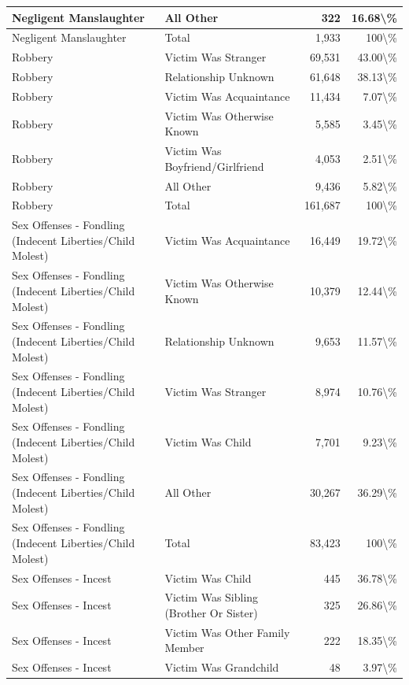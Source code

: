 \documentclass[
]{krantz}
\begin{document}
\begin{longtable}[t]{l|l|r|r}
\hline
Negligent Manslaughter & All Other & 322 & 16.68\textbackslash{}\%\\
\hline
Negligent Manslaughter & Total & 1,933 & 100\textbackslash{}\%\\
\hline
Robbery & Victim Was Stranger & 69,531 & 43.00\textbackslash{}\%\\
\hline
Robbery & Relationship Unknown & 61,648 & 38.13\textbackslash{}\%\\
\hline
Robbery & Victim Was Acquaintance & 11,434 & 7.07\textbackslash{}\%\\
\hline
Robbery & Victim Was Otherwise Known & 5,585 & 3.45\textbackslash{}\%\\
\hline
Robbery & Victim Was Boyfriend/Girlfriend & 4,053 & 2.51\textbackslash{}\%\\
\hline
Robbery & All Other & 9,436 & 5.82\textbackslash{}\%\\
\hline
Robbery & Total & 161,687 & 100\textbackslash{}\%\\
\hline
Sex Offenses - Fondling (Indecent Liberties/Child Molest) & Victim Was Acquaintance & 16,449 & 19.72\textbackslash{}\%\\
\hline
Sex Offenses - Fondling (Indecent Liberties/Child Molest) & Victim Was Otherwise Known & 10,379 & 12.44\textbackslash{}\%\\
\hline
Sex Offenses - Fondling (Indecent Liberties/Child Molest) & Relationship Unknown & 9,653 & 11.57\textbackslash{}\%\\
\hline
Sex Offenses - Fondling (Indecent Liberties/Child Molest) & Victim Was Stranger & 8,974 & 10.76\textbackslash{}\%\\
\hline
Sex Offenses - Fondling (Indecent Liberties/Child Molest) & Victim Was Child & 7,701 & 9.23\textbackslash{}\%\\
\hline
Sex Offenses - Fondling (Indecent Liberties/Child Molest) & All Other & 30,267 & 36.29\textbackslash{}\%\\
\hline
Sex Offenses - Fondling (Indecent Liberties/Child Molest) & Total & 83,423 & 100\textbackslash{}\%\\
\hline
Sex Offenses - Incest & Victim Was Child & 445 & 36.78\textbackslash{}\%\\
\hline
Sex Offenses - Incest & Victim Was Sibling (Brother Or Sister) & 325 & 26.86\textbackslash{}\%\\
\hline
Sex Offenses - Incest & Victim Was Other Family Member & 222 & 18.35\textbackslash{}\%\\
\hline
Sex Offenses - Incest & Victim Was Grandchild & 48 & 3.97\textbackslash{}\%\\

\end{longtable}
\end{document}
